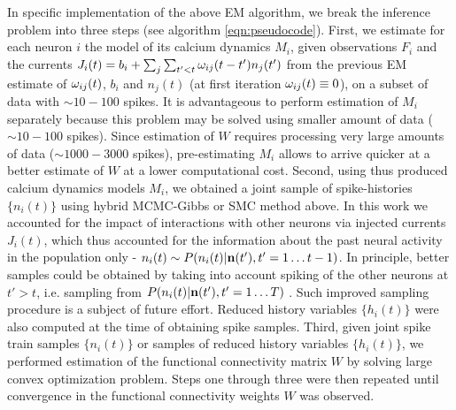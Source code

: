 In specific implementation of the above EM algorithm, we break the inference problem into three steps (see algorithm \ref{eqn:pseudocode}).  First, we estimate for each neuron $i$ the model of its calcium dynamics $M_i$, given observations $F_i$ and the currents $J_i(t)=b_i+\sum_{j}\sum_{t'<t}\omega_{ij}(t-t')n_{j}(t')$ from the previous EM estimate of $\omega_{ij}(t)$, $b_i$ and $n_{j}(t)$ (at first iteration $\omega_{ij}(t) \equiv 0$), on a subset of data with $\sim 10-100$ spikes.  It is advantageous to perform estimation of $M_i$ separately because this problem may be solved using smaller amount of data ($\sim 10-100$ spikes). Since estimation of $W$ requires processing very large amounts of data ($\sim 1000-3000$ spikes), pre-estimating $M_i$ allows to arrive quicker at a better estimate of $W$ at a lower computational cost.  Second, using thus produced calcium dynamics models $M_i$, we obtained a joint sample of spike-histories $\{ n_i(t)\}$ using hybrid MCMC-Gibbs or SMC method above.  In this work we accounted for the impact of interactions with other neurons via injected currents $J_i(t)$, which thus accounted for the information about the past neural activity in the population only - $n_i(t) \sim P(n_i(t)|{\bf n}(t'), {t'=1\ldots t-1})$. In principle, better samples could be obtained by taking into account spiking of the other neurons at $t'>t$, i.e. sampling from $P(n_i(t)|{\bf n}(t'), {t'=1\ldots T})$ \cite{PL07}. Such improved sampling procedure is a subject of future effort.  Reduced history variables $\{h_i(t)\}$ were also computed at the time of obtaining spike samples.  Third, given joint spike train samples $\{ n_i(t)\}$ or samples of reduced history variables $\{ h_i(t)\}$, we performed estimation of the functional connectivity matrix $W$ by solving large convex optimization problem.  Steps one through three were then repeated until convergence in the functional connectivity weights $W$ was observed.

